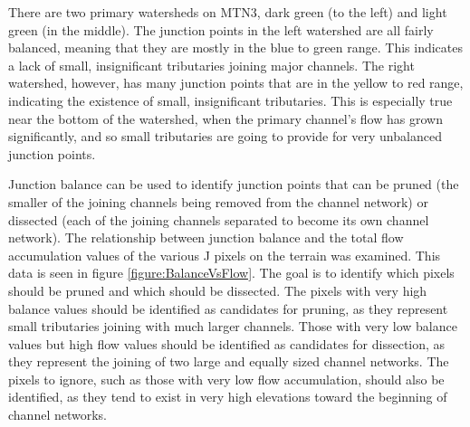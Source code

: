 There are two primary watersheds on MTN3, dark green (to the left) and light green (in the middle). The junction points in the left watershed are all fairly balanced, meaning that they are mostly in the blue to green range. This indicates a lack of small, insignificant tributaries joining major channels. The right watershed, however, has many junction points that are in the yellow to red range, indicating the existence of small, insignificant tributaries. This is especially true near the bottom of the watershed, when the primary channel's flow has grown significantly, and so small tributaries are going to provide for very unbalanced junction points.





Junction balance can be used to identify junction points that can be pruned (the smaller of the joining channels being removed from the channel network) or dissected (each of the joining channels separated to become its own channel network). 
% 
% 
The relationship between junction balance and the total flow accumulation values of the various J pixels on the terrain was examined. This data is seen in figure \ref{figure:BalanceVsFlow}. The goal is to identify which pixels should be pruned and which should be dissected. The pixels with very high balance values should be identified as candidates for pruning, as they represent small tributaries joining with much larger channels. Those with very low balance values but high flow values should be identified as candidates for dissection, as they represent the joining of two large and equally sized channel networks. The pixels to ignore, such as those with very low flow accumulation, should also be identified, as they tend to exist in very high elevations toward the beginning of channel networks. 

